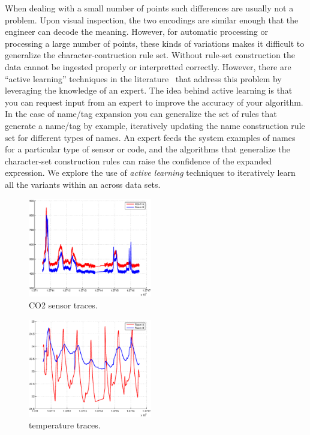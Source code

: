 
When dealing with a small number of points such differences are usually not a problem.  Upon 
visual inspection, the two
encodings are similar enough that the engineer can decode the meaning.  However, for automatic 
processing or processing a large number of points, these kinds of variations makes it difficult 
to generalize the character-contruction
rule set.  Without rule-set construction the data cannot be ingested properly or interpretted
correctly.  However, there are ``active learning'' techniques in the literature~\cite{ms} 
that address this problem by leveraging the knowledge of an expert. The idea behind active learning
is that you can request input from an expert to improve the accuracy of your algorithm.
In the case of name/tag expansion you 
can generalize the set of rules that generate a name/tag by example, iteratively
updating the name construction rule set for different types of names.  An expert feeds
the system examples of names for a particular type of sensor or code, and the algorithms 
that generalize the character-set construction rules can raise the confidence of the
expanded expression.
We explore the use
of \emph{active learning} techniques to iteratively learn all the variants within an across
data sets.




\begin{figure}[h!]
\centering
    \includegraphics[width=0.48\textwidth]{figs/co2_pair.eps}
    \caption{CO2 sensor traces.}
\label{fig:co2traces}
\end{figure}

\begin{figure}[h!]
\centering
    \includegraphics[width=0.48\textwidth]{figs/temp_pair.eps}
    \caption{temperature traces.}
\label{fig:temptraces}
\end{figure}

% 



